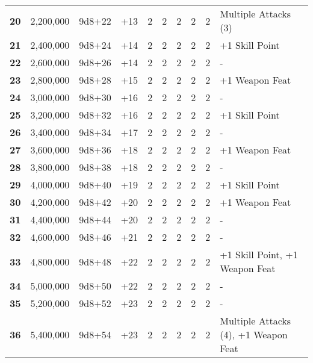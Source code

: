 \begin {table}[H]
\begin{tabularx}{\columnwidth}{>{\bfseries}cccM{.31in}M{.51in}M{.25in}M{.43in}M{.32in}M{.45in}Y}
		20 & 2,200,000 & 9d8+22 & +13 & 2 & 2 & 2 & 2 & 2 & Multiple Attacks (3)\\
		21 & 2,400,000 & 9d8+24 & +14 & 2 & 2 & 2 & 2 & 2 & +1 Skill Point\\
		22 & 2,600,000 & 9d8+26 & +14 & 2 & 2 & 2 & 2 & 2 & -\\
		23 & 2,800,000 & 9d8+28 & +15 & 2 & 2 & 2 & 2 & 2 & +1 Weapon Feat\\
		24 & 3,000,000 & 9d8+30 & +16 & 2 & 2 & 2 & 2 & 2 & -\\
		25 & 3,200,000 & 9d8+32 & +16 & 2 & 2 & 2 & 2 & 2 & +1 Skill Point\\
		26 & 3,400,000 & 9d8+34 & +17 & 2 & 2 & 2 & 2 & 2 & -\\
		27 & 3,600,000 & 9d8+36 & +18 & 2 & 2 & 2 & 2 & 2 & +1 Weapon Feat\\
		28 & 3,800,000 & 9d8+38 & +18 & 2 & 2 & 2 & 2 & 2 & -\\
		29 & 4,000,000 & 9d8+40 & +19 & 2 & 2 & 2 & 2 & 2 & +1 Skill Point\\
		30 & 4,200,000 & 9d8+42 & +20 & 2 & 2 & 2 & 2 & 2 & +1 Weapon Feat\\
		31 & 4,400,000 & 9d8+44 & +20 & 2 & 2 & 2 & 2 & 2 & -\\
		32 & 4,600,000 & 9d8+46 & +21 & 2 & 2 & 2 & 2 & 2 & -\\
		33 & 4,800,000 & 9d8+48 & +22 & 2 & 2 & 2 & 2 & 2 & +1 Skill Point, +1 Weapon Feat\\
		34 & 5,000,000 & 9d8+50 & +22 & 2 & 2 & 2 & 2 & 2 & -\\
		35 & 5,200,000 & 9d8+52 & +23 & 2 & 2 & 2 & 2 & 2 & -\\
		36 & 5,400,000 & 9d8+54 & +23 & 2 & 2 & 2 & 2 & 2 & Multiple Attacks (4), +1 Weapon Feat\
  \end {tabularx}
\end {table}
\newpage
